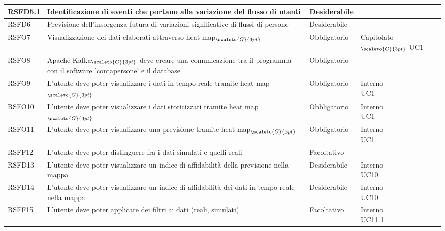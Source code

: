{\begin{center}
\begin{longtable}{|p{2.5cm}|p{4.5cm}|p{3.5cm}|p{4cm}|}
			\hline
			\centering RSFD5.1 & Identificazione di eventi che portano alla variazione del flusso di utenti &\centering  Desiderabile & \makecell[tc]{Capitolato$_{\scaleto{G}{3pt}}$}  \\
			\hline
			\centering RSFD6 & Previsione dell'insorgenza futura di variazioni significative di flussi di persone & \centering Desiderabile & \makecell[tc]{Capitolato$_{\scaleto{G}{3pt}}$ }  \\
			\hline
			\centering RSFO7 & Visualizzazione dei dati elaborati attraverso heat map$_{\scaleto{G}{3pt}}$ &\centering  Obbligatorio & \makecell[tc]{Capitolato$_{\scaleto{G}{3pt}}$ \\ UC1}  \\
			\hline
			\centering RSFO8 & Apache Kafka$_{\scaleto{G}{3pt}}$ deve creare una comunicazione tra il programma con il software 'contapersone' e il database  &\centering  Obbligatorio &  \makecell[tc]{Interno} 	\\
			\hline
			\centering RSFO9 & L'utente deve poter visualizzare i dati in tempo reale tramite heat map$_{\scaleto{G}{3pt}}$  &\centering  Obbligatorio &  \makecell[tc]{Interno \\ UC1} 	\\
			\hline
			\centering RSFO10 & L'utente deve poter visualizzare i dati storicizzati tramite heat map$_{\scaleto{G}{3pt}}$  &\centering  Obbligatorio &  \makecell[tc]{Interno \\ UC1} 	\\
			\hline
			\centering RSFO11 & L'utente deve poter visualizzare una previsione tramite heat map$_{\scaleto{G}{3pt}}$  &\centering  Obbligatorio &  \makecell[tc]{Interno \\ UC1} 	\\
			\hline
			\centering RSFF12 & L'utente deve poter distinguere fra i dati simulati e quelli reali  &\centering  Facoltativo &  \makecell[tc]{Interno} 	\\
			\hline
			\centering RSFD13 & L'utente deve poter visualizzare un indice di affidabilità della previsione nella mappa  &\centering  Desiderabile &  \makecell[tc]{Interno \\ UC10} 	\\
			\hline
			\centering RSFD14 & L'utente deve poter visualizzare un indice di affidabilità dei dati in tempo reale nella mappa  &\centering  Desiderabile &  \makecell[tc]{Interno \\ UC10} 	\\
			\hline
			\centering RSFF15 & L'utente deve poter applicare dei filtri ai dati (reali, simulati)  &\centering  Facoltativo &  \makecell[tc]{Interno \\ UC11.1 } 	\\

\end{longtable}
\end{center}}

